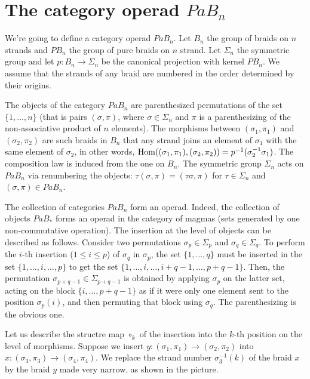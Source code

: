 \documentclass[TFM.tex]{subfiles}
\begin{document}
\section{The category operad $PaB_n$}

We're going to define a category operad $PaB_n$. Let $B_n$ the group of braids on $n$ strands and $PB_n$ the group of pure braids on $n$ strand. Let $\Sigma_n$ the symmetric group and let $p:B_n\to \Sigma_n$ be the canonical projection with kernel $PB_n$. We assume that the strands of any braid are numbered in the order determined by their origins. 

The objects of the category $PaB_n$ are parenthesized permutations of the set $\{1,\dots, n\}$ (that is pairs $(\sigma,\pi)$, where $\sigma\in\Sigma_n$ and $\pi$ is a parenthesizing of the non-associative product of $n$ elements). The morphisms between $(\sigma_1,\pi_1)$ and $(\sigma_2,\pi_2)$ are such braids in $B_n$ that any strand joins an element of $\sigma_1$ with the same element of $\sigma_2$, in other words, $\operatorname{Hom}((\sigma_1,\pi_1),(\sigma_2,\pi_2))=p^{-1}(\sigma_2^{-1}\sigma_1)$. The composition law is induced from the one on $B_n$. The symmetric group $\Sigma_n$ acts on $PaB_n$ via renumbering the objects: $\tau(\sigma,\pi)=(\tau\sigma,\pi)$ for $\tau\in\Sigma_n$ and $(\sigma,\pi)\in PaB_n$. 


The collection of categories $PaB_n$ form an operad. Indeed, the collection of objects $PaB_*$ forms an operad in the category of magmas (sets generated by one non-commutative operation). The insertion at the level of objects can be described as follows. Consider two permutations $\sigma_p\in\Sigma_p$ and $\sigma_q\in\Sigma_q$. To perform the $i$-th insertion ($1\leq i\leq p$) of $\sigma_q$ in $\sigma_p$, the set $\{1,\dots, q\}$ must be inserted in the set $\{1,\dots, i,\dots, p\}$ to get the set $\{1,\dots, i,\dots,i+q-1,\dots, p+q-1\}$. Then, the permutation $\sigma_{p+q-1}\in\Sigma_{p+q-1}$ is obtained by applying $\sigma_p$ on the latter set, acting on the block $\{i,\dots, p+q-1\}$ as if it were only one element sent to the position $\sigma_p(i)$, and then permuting that block using $\sigma_q$. The parenthesizing is the obvious one. 

Let us describe the structre map $\circ_k$ of the insertion into the $k$-th position on the level of morphisms. Suppose we insert $y:(\sigma_1,\pi_1)\to (\sigma_2,\pi_2)$ into $x:(\sigma_3,\pi_3)\to(\sigma_4,\pi_4)$. We replace the strand number $\sigma^{-1}_3(k)$ of the braid $x$ by the braid $y$ made very narrow, as shown in the picture.
\end{document}
